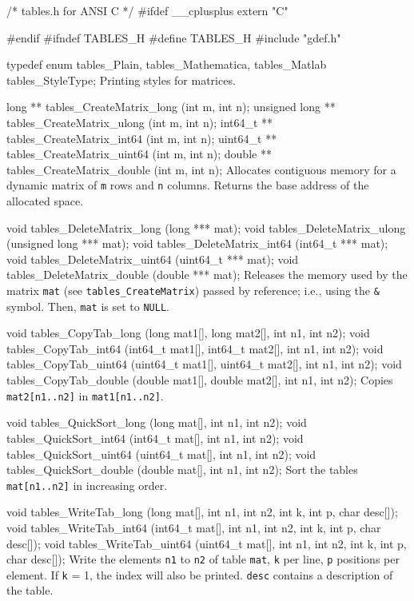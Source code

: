 \code\hide
/* tables.h for ANSI C */
#ifdef __cplusplus
extern "C" {
#endif
#ifndef TABLES_H
#define TABLES_H
\endhide
#include "gdef.h"
\endcode

\code

typedef enum {
   tables_Plain,
   tables_Mathematica,
   tables_Matlab
   } tables_StyleType;
\endcode
  \tab Printing styles for matrices.
  \endtab

\code

long ** tables_CreateMatrix_long  (int m, int n);
unsigned long ** tables_CreateMatrix_ulong (int m, int n);
int64_t ** tables_CreateMatrix_int64  (int m, int n);
uint64_t ** tables_CreateMatrix_uint64 (int m, int n);
double ** tables_CreateMatrix_double  (int m, int n);
\endcode
  \tab Allocates contiguous memory for a dynamic 
  matrix of {\tt m} rows and {\tt n} columns. Returns the base
  address of the allocated space.
  \endtab
\code

void tables_DeleteMatrix_long  (long *** mat);
void tables_DeleteMatrix_ulong (unsigned long *** mat);
void tables_DeleteMatrix_int64  (int64_t *** mat);
void tables_DeleteMatrix_uint64 (uint64_t *** mat);
void tables_DeleteMatrix_double  (double *** mat);
\endcode
  \tab Releases the memory used by the matrix {\tt mat}
  (see {\tt tables\_CreateMatrix}) passed by reference; i.e., using the {\tt \&} symbol. 
  Then, {\tt mat} is set to {\tt NULL}.
  \endtab
\code

void tables_CopyTab_long (long mat1[], long mat2[], int n1, int n2);
void tables_CopyTab_int64 (int64_t mat1[], int64_t mat2[], int n1, int n2);
void tables_CopyTab_uint64 (uint64_t mat1[], uint64_t mat2[], int n1, int n2);
void tables_CopyTab_double (double mat1[], double mat2[], int n1, int n2);
\endcode
  \tab Copies {\tt mat2[n1..n2]} in {\tt mat1[n1..n2]}.
  \endtab
\code

void tables_QuickSort_long (long mat[], int n1, int n2);
void tables_QuickSort_int64 (int64_t mat[], int n1, int n2);
void tables_QuickSort_uint64 (uint64_t mat[], int n1, int n2);
void tables_QuickSort_double (double mat[], int n1, int n2);
\endcode
 \tab Sort the tables {\tt mat[n1..n2]} in increasing order.
 \endtab
\code

void tables_WriteTab_long (long mat[], int n1, int n2, int k, int p, 
                           char desc[]);
void tables_WriteTab_int64 (int64_t mat[], int n1, int n2, int k, int p, 
                            char desc[]);
void tables_WriteTab_uint64 (uint64_t mat[], int n1, int n2, int k, int p, 
                             char desc[]);
\endcode
 \tab  Write the elements {\tt n1} to {\tt n2} of table {\tt mat},
  {\tt k} per line, {\tt p} positions per element.
  If  {\tt k} = 1, the index will also be printed. {\tt desc}
  contains a description of the table.
 \endtab
\code

}
